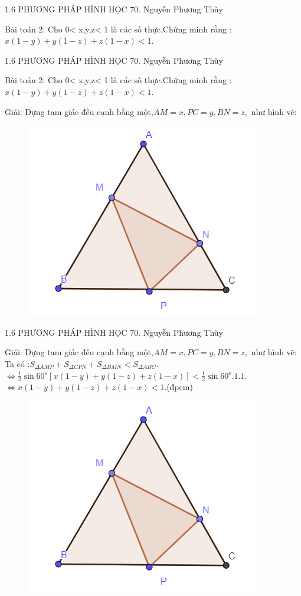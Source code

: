 \begin{frame}{1.6 PHƯƠNG PHÁP HÌNH HỌC
\hspace{3cm}  70. Nguyễn Phương Thùy} 
\begin{block}{Bài toán 2:}
Cho 0< x,y,z< 1 là các số thực.Chứng minh rằng : \\
$x(1-y) + y(1-z) + z(1-x) < 1.$
\end{block}
\end{frame}


\begin{frame}{1.6 PHƯƠNG PHÁP HÌNH HỌC
\hspace{3cm}  70. Nguyễn Phương Thùy} 
\begin{block}{Bài toán 2:}
Cho 0< x,y,z< 1 là các số thực.Chứng minh rằng : \\
$x(1-y) + y(1-z) + z(1-x) < 1.$
\end{block}

\begin{block}{Giải:}
Dựng tam giác đều cạnh bằng một,$AM=x,PC=y,BN=z,$ như hình vẽ:\\
\begin{figure}
    \centering
    \includegraphics[width=0.3\linewidth]{anh1.png}
\end{figure}
\end{block}
\end{frame}


\begin{frame}{1.6 PHƯƠNG PHÁP HÌNH HỌC
\hspace{3cm}  70. Nguyễn Phương Thùy} 
\begin{block}{Giải:}
Dựng tam giác đều cạnh bằng một,$AM=x,PC=y,BN=z,$ như hình vẽ:\\Ta có :$S_{\Delta AMP} + S_{\Delta CPN} + S_{\Delta BMN} < S_{\Delta ABC} . $\\$ \Leftrightarrow \frac{1}{2}\sin{60^o}[x(1-y) + y(1-z) + z(1-x) ] < \frac{1}{2}\sin{60^o}.1.1.$\\ $\Leftrightarrow x(1-y) + y(1-z) + z(1-x) < 1.$(đpcm)

\begin{figure}
    \raggedleft
    \includegraphics[width=0.25\linewidth]{anh1.png}
\end{figure}
\end{block}
\end{frame}

